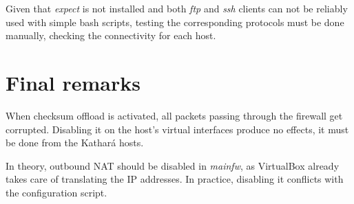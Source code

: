 \documentclass[draft]{homework}
\newcommand{\kat}{Kathará\xspace}
\newcommand{\vb}{VirtualBox\xspace}
\newcommand{\mainfw}{\textit{mainfw}\xspace}
\begin{document}
    Given that \textit{expect} is not installed and both \textit{ftp} and \textit{ssh} clients can not be reliably used with simple bash scripts, testing the corresponding protocols must be done manually, checking the connectivity for each host.
    
    
    \section{Final remarks}
    When checksum offload is activated, all packets passing through the firewall get corrupted. Disabling it on the host's virtual interfaces produce no effects, it must be done from the \kat hosts.
    
    In theory, outbound NAT should be disabled in \mainfw, as \vb already takes care of translating the IP addresses. In practice, disabling it conflicts with the configuration script.
\end{document}
